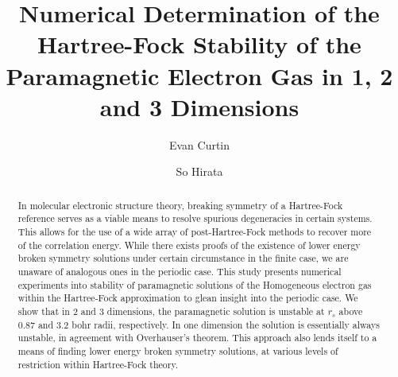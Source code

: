 \documentclass[preprint, journal=prl]{revtex4-1}
\begin{document}
\title{Numerical Determination of the Hartree-Fock Stability of the Paramagnetic Electron Gas in 1, 2 and 3 Dimensions}
\author{Evan Curtin}
\author{So Hirata}

\begin{abstract}
  In molecular electronic structure theory, breaking symmetry of a Hartree-Fock reference serves as a viable means to resolve spurious degeneracies in certain systems. This allows for the use of a wide array of post-Hartree-Fock methods to recover more of the correlation energy. While there exists proofs of the existence of lower energy broken symmetry solutions under certain circumstance in the finite case, we are unaware of analogous ones in the periodic case. This study presents numerical experiments into stability of paramagnetic solutions of the Homogeneous electron gas within the Hartree-Fock approximation to glean insight into the periodic case. We show that in 2 and 3 dimensions, the paramagnetic solution is unstable at $r_s$ above 0.87 and 3.2 bohr radii, respectively. In one dimension the solution is essentially always unstable, in agreement with Overhauser's theorem. This approach also lends itself to a means of finding lower energy broken symmetry solutions, at various levels of restriction within Hartree-Fock theory.
\end{abstract}

\maketitle
\end{document}
